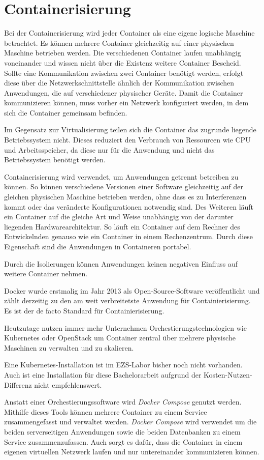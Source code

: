 \section{Containerisierung} \label{sec:Containerisierung}
Bei der Containerisierung wird jeder Container als eine eigene logische Maschine betrachtet. Es können mehrere Container gleichzeitig auf einer physischen Maschine betrieben werden. 
Die verschiedenen Container laufen unabhängig voneinander und wissen nicht über die Existenz weitere Container Bescheid. Sollte eine Kommunikation zwischen zwei Container benötigt werden, erfolgt diese über die Netzwerkschnittstelle ähnlich der Kommunikation zwischen Anwendungen, die auf verschiedener physischer Geräte. \cite{boersmaContainerizationDefinitionBest2019} Damit die Container kommunizieren können, muss vorher ein Netzwerk konfiguriert werden, in dem sich die Container gemeinsam befinden.

Im Gegensatz zur Virtualisierung teilen sich die Container das zugrunde liegende Betriebssystem nicht. Dieses reduziert den Verbrauch von Ressourcen wie CPU und Arbeitsspeicher, da diese nur für die Anwendung und nicht das Betriebssystem benötigt werden.

Containerisierung wird verwendet, um Anwendungen getrennt betreiben zu können. So können verschiedene Versionen einer Software gleichzeitig auf der gleichen physischen Maschine betrieben werden, ohne dass es zu Interferenzen kommt oder das veränderte Konfigurationen notwendig sind. Des Weiteren läuft ein Container auf die gleiche Art und Weise unabhängig von der darunter liegenden Hardwarearchitektur. So läuft ein Container auf dem Rechner des Entwickelnden genauso wie ein Container in einem Rechenzentrum. Durch diese Eigenschaft sind die Anwendungen in Containeren portabel. \cite{boersmaContainerizationDefinitionBest2019}

Durch die Isolierungen können Anwendungen keinen negativen Einfluss auf weitere Container nehmen.

Docker wurde erstmalig im Jahr 2013 als Open-Source-Software veröffentlicht und zählt derzeitig zu den am weit verbreitetste Anwendung für Containierisierung. Es ist der de facto Standard für Containierisierung. 
\cite{boersmaContainerizationDefinitionBest2019}

Heutzutage nutzen immer mehr Unternehmen Orchestierungstechnologien wie Kubernetes oder OpenStack um Container zentral über mehrere physische Maschinen zu verwalten und zu skalieren.
\cite{gaviganHistoryAngular2018}

Eine Kubernetes-Installation ist im EZS-Labor bisher noch nicht vorhanden. Auch ist eine Installation für diese Bachelorarbeit aufgrund der Kosten-Nutzen-Differenz nicht empfehlenswert.

Anstatt einer Orchestierungssoftware wird \textit{Docker Compose} genutzt werden.
Mithilfe dieses Tools können mehrere Container zu einem Service zusammengefasst und verwaltet werden. \textit{Docker Compose} wird verwendet um die beiden serverseitigen Anwendungen sowie die beiden Datenbanken zu einem Service zusammenzufassen. Auch sorgt es dafür, dass die Container in einem eigenen virtuellen Netzwerk laufen und nur untereinander kommunizieren können. \cite{dockerinc.OverviewDockerCompose2020} 